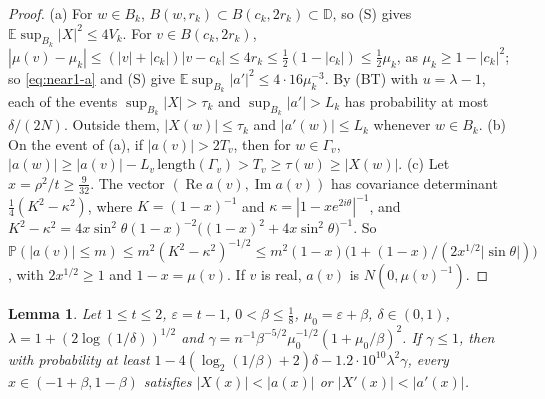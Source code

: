\documentclass[11pt]{amsart}
\newtheorem{lemma}[theorem]{Lemma}
\theoremstyle{definition}
\theoremstyle{remark}
\numberwithin{equation}{section}
\newcommand{\D}{\mathbb{D}}
\newcommand{\E}{\mathbb{E}}
\newcommand{\PP}{\mathbb{P}}
\newcommand{\eps}{\varepsilon}
\DeclareMathOperator{\re}{Re}
\DeclareMathOperator{\im}{Im}
\begin{document}
\begin{proof}
(a) For $w\in B_k$, $B(w,r_k)\subset B(c_k,2r_k)\subset\D$, so (S) gives $\E\sup_{B_k}|X|^2\le4V_k$. For $v\in B(c_k,2r_k)$, $|\mu(v)-\mu_k|\le(|v|+|c_k|)|v-c_k|\le4r_k\le\frac12(1-|c_k|)\le\frac12\mu_k$, as $\mu_k\ge1-|c_k|^2$; so \eqref{eq:near1-a} and (S) give $\E\sup_{B_k}|a'|^2\le4\cdot16\mu_k^{-3}$. By (BT) with $u=\lambda-1$, each of the events $\sup_{B_k}|X|>\tau_k$ and $\sup_{B_k}|a'|>L_k$ has probability at most $\delta/(2N)$. Outside them, $|X(w)|\le\tau_k$ and $|a'(w)|\le L_k$ whenever $w\in B_k$.
(b) On the event of (a), if $|a(v)|>2T_v$, then for $w\in\Gamma_v$, $|a(w)|\ge|a(v)|-L_v\,\mathrm{length}(\Gamma_v)>T_v\ge\tau(w)\ge|X(w)|$.
(c) Let $x=\rho^2/t\ge\frac9{32}$. The vector $(\re a(v),\im a(v))$ has covariance determinant $\frac14(K^2-\kappa^2)$, where $K=(1-x)^{-1}$ and $\kappa=|1-xe^{2i\theta}|^{-1}$, and $K^2-\kappa^2=4x\sin^2\theta(1-x)^{-2}\bigl((1-x)^2+4x\sin^2\theta\bigr)^{-1}$. So $\PP(|a(v)|\le m)\le m^2(K^2-\kappa^2)^{-1/2}\le m^2(1-x)\bigl(1+(1-x)/(2x^{1/2}|\sin\theta|)\bigr)$, with $2x^{1/2}\ge1$ and $1-x=\mu(v)$. If $v$ is real, $a(v)$ is $N(0,\mu(v)^{-1})$.
\end{proof}

\begin{lemma}\label{lem:near1-real}
Let $1\le t\le2$, $\eps=t-1$, $0<\beta\le\frac18$, $\mu_0=\eps+\beta$, $\delta\in(0,1)$, $\lambda=1+(2\log(1/\delta))^{1/2}$ and $\gamma=n^{-1}\beta^{-5/2}\mu_0^{-1/2}(1+\mu_0/\beta)^2$. If $\gamma\le1$, then with probability at least $1-4(\log_2(1/\beta)+2)\delta-1.2\cdot10^{10}\lambda^2\gamma$, every $x\in(-1+\beta,1-\beta)$ satisfies $|X(x)|<|a(x)|$ or $|X'(x)|<|a'(x)|$.
\end{lemma}
\end{document}
